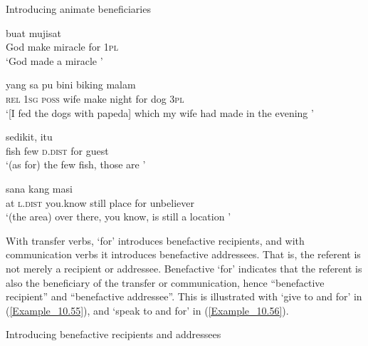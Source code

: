 \begin{styleExampleTitle}
Introducing animate beneficiaries
\end{styleExampleTitle}

\ea
\label{Example_10.51}
 {buat} {mujisat} {} {}\\ %
 God  make  miracle  for  \textsc{1pl}\\
\glt 
‘God made a miracle ’ \textstyleExampleSource{[080917-008-NP.0163]}
\z

\ea
\label{Example_10.52}
\gll {\ldots} {yang} {sa} {pu} {bini} {biking} {malam} {} {} {}\\ %
{}    \textsc{rel}  \textsc{1sg}  \textsc{poss}  wife  make  night  for  dog  \textsc{3pl}\\
\glt 
‘[I fed the dogs with papeda] which my wife had made in the evening ’ \textstyleExampleSource{[080919-003-NP.0002]}
\z

\ea
\label{Example_10.53}
 {sedikit,} {itu} {} {}\\ %
 fish  few  \textsc{d.dist}  for  guest\\
\glt 
‘(as for) the few fish, those are ’ \textstyleExampleSource{[081014-011-CvEx.0008]}
\z

\ea
\label{Example_10.54}
 {sana} {kang} {masi} {} {} {}\\ %
 at  \textsc{l.dist}  you.know  still  place  for  unbeliever\\
\glt 
‘(the area) over there, you know, is still a location ’ \textstyleExampleSource{[081011-022-Cv.0238]}
\z


With transfer verbs,  ‘for’ introduces benefactive recipients, and with communication verbs it introduces benefactive addressees. That is, the referent is not merely a recipient or addressee. Benefactive  ‘for’ indicates that the referent is also the beneficiary of the transfer or communication, hence ``benefactive recipient'' and ``benefactive addressee''. This is illustrated with  ‘give to and for’ in (\ref{Example_10.55}), and  ‘speak to and for’ in (\ref{Example_10.56}).


\begin{styleExampleTitle}
Introducing benefactive recipients and addressees
\end{styleExampleTitle}


